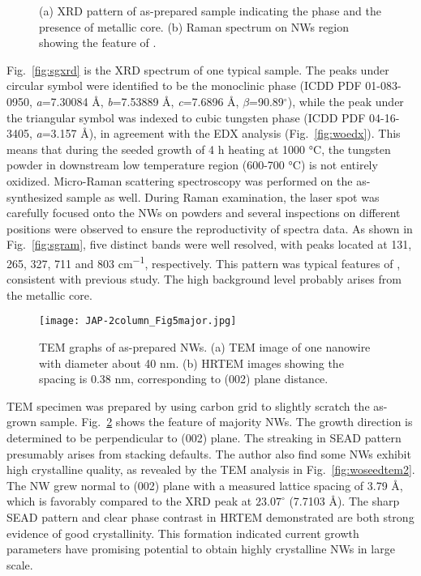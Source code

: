 \begin{figure}[htb]
\centering
{}\hspace{0.04\textwidth}
\caption[Characterization of seeded growth : XRD and Raman]{ (a) XRD pattern of as-prepared sample indicating the  phase and the presence of metallic core. (b) Raman spectrum on NWs region showing the feature of .}
\label{fig:woseedxrd}
\end{figure}

Fig.~\ref{fig:sgxrd} is the XRD spectrum of one typical sample. The peaks under circular symbol were identified to be the monoclinic  phase (ICDD PDF 01-083-0950, \emph{a}=7.30084 \AA, \emph{b}=7.53889 \AA, \emph{c}=7.6896 \AA, $\beta$=90.89$^\circ$), while the peak under the triangular symbol was indexed to cubic tungsten phase (ICDD PDF 04-16-3405, \emph{a}=3.157 \AA), in agreement with the EDX analysis (Fig.~\ref{fig:woedx}). This means that during the  seeded growth of 4 h heating at 1000 \si{\degreeCelsius}, the tungsten powder in downstream low temperature region (600-700 \si{\degreeCelsius}) is not entirely oxidized. Micro-Raman scattering spectroscopy was performed on the as-synthesized sample as well. During Raman examination, the laser spot was carefully focused onto the NWs on powders and several inspections on different positions were observed to ensure the reproductivity of spectra data. As shown in Fig.~\ref{fig:sgram}, five distinct bands were well resolved, with peaks located at 131, 265, 327, 711 and 803 \si{cm^{-1}}, respectively. This pattern was typical features of , consistent with previous study.\cite{Salje1975a,Dixit1986} The high background level probably arises from the metallic core.

\begin{figure}[htb]
\centering
\texttt{[image: JAP-2column\_Fig5major.jpg]}
\caption[Characterization of : TEM]{TEM graphs of as-prepared NWs. (a) TEM image of one nanowire with diameter about 40 nm. (b) HRTEM images showing the spacing is 0.38 nm, corresponding to (002) plane distance.}
\label{fig:woseedtem1}
\end{figure}

TEM specimen was prepared by using carbon grid to slightly scratch the as-grown sample. Fig.~\ref{fig:woseedtem1} shows the feature of majority NWs. The growth direction is determined to be perpendicular to (002) plane. The streaking in SEAD pattern presumably arises from stacking defaults. The author also find some NWs exhibit high crystalline quality, as revealed by the TEM analysis in Fig.~\ref{fig:woseedtem2}. The NW grew normal to (002) plane with a measured lattice spacing of 3.79 \AA, which is favorably compared to the XRD peak at $23.07^\circ$ (7.7103 \AA). The sharp SEAD pattern and clear phase contrast in HRTEM demonstrated are both strong evidence of good crystallinity. This formation indicated current growth parameters have promising potential to obtain highly crystalline  NWs in large scale. 

